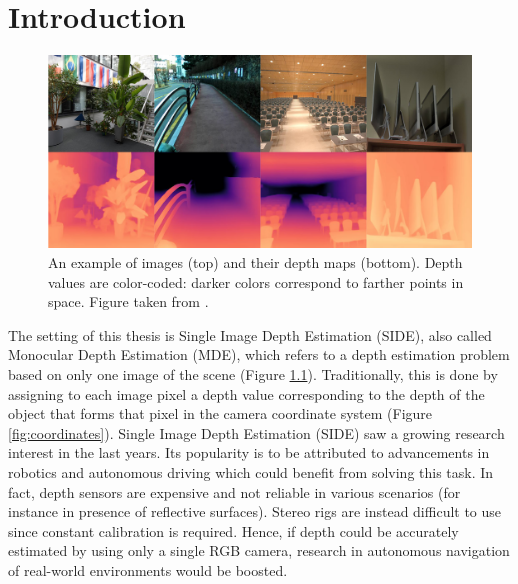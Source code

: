 \chapter{Introduction}
\label{ch:intro}
%
\begin{figure}
    \centering
    \includegraphics[scale=0.3]{figs/depth_maps_example2}
    \caption{
        An example of images (top) and their depth maps (bottom).
        Depth values are color-coded: darker colors correspond to farther points in space.
        Figure taken from \cite{ZoeDepth}.
        \label{fig:depth_maps_example}
    }
\end{figure}
The setting of this thesis is Single Image Depth Estimation (SIDE), also called Monocular Depth Estimation (MDE), which refers to a depth estimation problem based on only one image of the scene (Figure \ref{fig:depth_maps_example}).
Traditionally, this is done by assigning to each image pixel a depth value corresponding to the depth of the object that forms that pixel in the camera coordinate system (Figure \ref{fig:coordinates}).
Single Image Depth Estimation (SIDE) saw a growing research interest in the last years.
Its popularity is to be attributed to advancements in robotics and autonomous driving which could benefit from solving this task.
In fact, depth sensors are expensive and not reliable in various scenarios (for instance in presence of reflective surfaces).
Stereo rigs are instead difficult to use since constant calibration is required.
Hence, if depth could be accurately estimated by using only a single RGB camera, research in autonomous navigation of real-world environments would be boosted.

